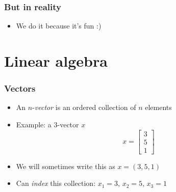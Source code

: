 \documentclass{beamer}
\begin{document}
    
    \begin{frame}
        \frametitle{But in reality}
        \begin{itemize}\itemsep=12pt
            \pause
            \item We do it because it's fun :)
        \end{itemize}
    \end{frame}
	
    \section{Linear algebra}
    \begin{frame}
        \frametitle{Vectors}
        \begin{itemize}\itemsep=12pt
            \item An $n$-\emph{vector} is an ordered collection of $n$ elements
            \item Example: a $3$-vector $x$
            \[
                x = \begin{bmatrix}
                    3\\
                    5\\
                    1
                \end{bmatrix}
            \]
            \item We will sometimes write this as $x = (3, 5, 1)$
            \pause
            \item Can \emph{index} this collection: $x_1=3$, $x_2 = 5$, $x_3=1$
        \end{itemize}
    \end{frame}
\end{document}
